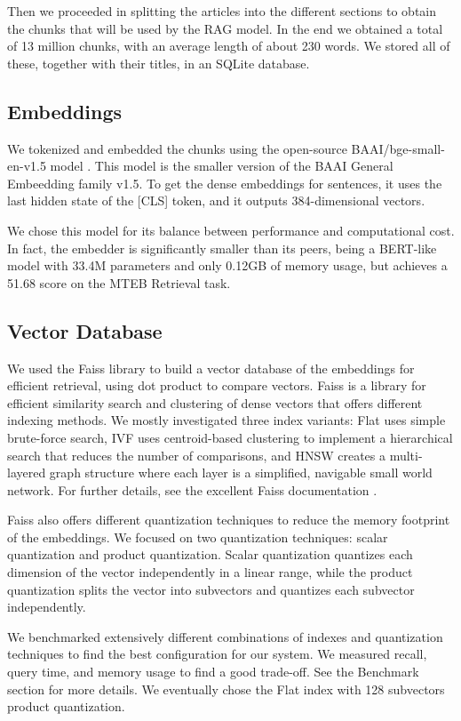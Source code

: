 \documentclass[11pt]{article}
\begin{document}
Then we proceeded in splitting the articles into the different sections to obtain the chunks 
that will be used by the RAG model. 
In the end we obtained a total of 13 million chunks, with an average length of about 230 words.
We stored all of these, together with their titles, in an SQLite database.

\subsection{Embeddings}

We tokenized and embedded the chunks using the open-source BAAI/bge-small-en-v1.5 model 
\cite{bge_hf}. This model is the smaller version of the BAAI General Embeedding family v1.5. 
To get the dense embeddings for sentences, it uses the last hidden state of the [CLS] token, and it outputs 
384-dimensional vectors.

We chose this model for its balance between performance and computational cost.
In fact, the embedder is significantly smaller than its peers, being a BERT-like model with 33.4M 
parameters and only 0.12GB of memory usage, but achieves a 51.68 score on the MTEB Retrieval task.

\subsection{Vector Database}

We used the Faiss library to build a vector database of the embeddings for efficient retrieval, using dot product to compare vectors.
Faiss is a library for efficient similarity search and clustering of dense vectors that offers different indexing methods.
We mostly investigated three index variants: Flat uses simple brute-force search, IVF uses centroid-based clustering to 
implement a hierarchical search that reduces the number of comparisons, and HNSW creates a multi-layered graph structure 
where each layer is a simplified, navigable small world network. For further details, see the excellent Faiss documentation \cite{faiss}.

Faiss also offers different quantization techniques to reduce the memory footprint of the embeddings. We focused
on two quantization techniques: scalar quantization and product quantization. 
Scalar quantization quantizes each dimension of the vector independently in a linear
range, while the product quantization splits the vector into subvectors and quantizes each
subvector independently.

We benchmarked extensively different combinations of indexes and quantization techniques to find the best configuration
for our system. We measured recall, query time, and memory usage to find a good trade-off. See the Benchmark section for more details.
We eventually chose the Flat index with 128 subvectors product quantization.
\end{document}
